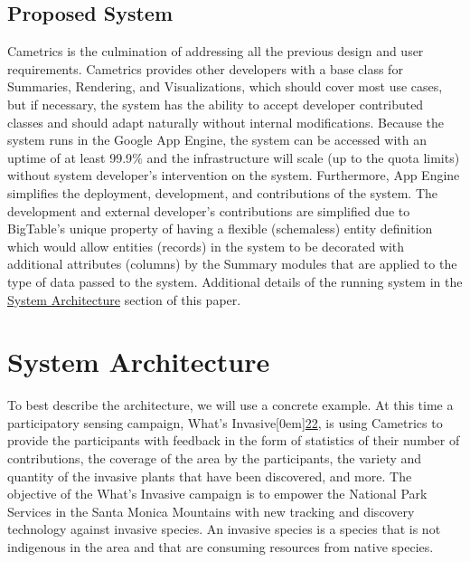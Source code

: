 \documentclass[10pt,a4paper,english]{article}
\begin{document}
\hypertarget{proposed-system}{}
\subsection*{Proposed System}
\label{proposed-system}

Cametrics is the culmination of addressing all the previous design and user requirements. Cametrics provides other developers with a base class for Summaries, Rendering, and Visualizations, which should cover most use cases, but if necessary, the system has the ability to accept developer contributed classes and should adapt naturally without internal modifications. Because the system runs in the Google App Engine, the system can be accessed with an uptime of at least 99.9{\%} and the infrastructure will scale (up to the quota limits) without system developer's intervention on the system. Furthermore, App Engine simplifies the deployment, development, and contributions of the system. The development and external developer's contributions are simplified due to BigTable's unique property of having a flexible (schemaless) entity definition which would allow entities (records) in the system to be decorated with additional attributes (columns) by the Summary modules that are applied to the type of data passed to the system. Additional details of the running system in the \href{\#system-architecture}{System Architecture} section of this paper.


\pagebreak{}




\hypertarget{system-architecture}{}
\section*{System Architecture}
\label{system-architecture}

To best describe the architecture, we will use a concrete example. At this time a participatory sensing campaign, What's Invasive\raisebox{.5em}[0em]{\scriptsize\hyperlink{id46}{22}}, is using Cametrics to provide the participants with feedback in the form of statistics of their number of contributions, the coverage of the area by the participants, the variety and quantity of the invasive plants that have been discovered, and more. The objective of the What's Invasive campaign is to empower the National Park Services in the Santa Monica Mountains with new tracking and discovery technology against invasive species. An invasive species is a species that is not indigenous in the area and that are consuming resources from native species.
\end{document}
